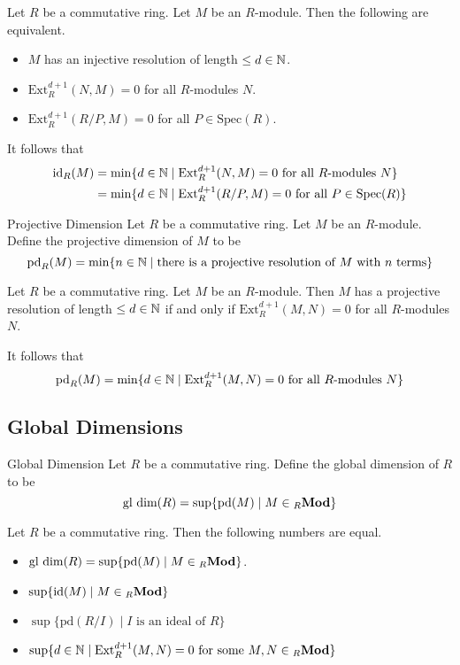 \documentclass[a4paper]{article}
\begin{document}
\begin{prp}{}{} Let $R$ be a commutative ring. Let $M$ be an $R$-module. Then the following are equivalent. 
\begin{itemize}
\item $M$ has an injective resolution of length $\leq d\in\mathbb{N}$. 
\item $\text{Ext}_R^{d+1}(N,M)=0$ for all $R$-modules $N$. 
\item $\text{Ext}_R^{d+1}(R/P,M)=0$ for all $P\in\text{Spec}(R)$. 
\end{itemize}
\end{prp}

It follows that 
\begin{align*}
\text{id}_R(M)&=\min\{d\in\mathbb{N}\;|\;\text{Ext}_R^{d+1}(N,M)=0\text{ for all }R\text{-modules }N\}\\
&=\min\{d\in\mathbb{N}\;|\;\text{Ext}_R^{d+1}(R/P,M)=0\text{ for all }P\in\text{Spec}(R)\}
\end{align*}

\begin{defn}{Projective Dimension}{} Let $R$ be a commutative ring. Let $M$ be an $R$-module. Define the projective dimension of $M$ to be $$\text{pd}_R(M)=\min\{n\in\mathbb{N}\;|\;\text{there is a projective resolution of }M\text{ with }n\text{ terms}\}$$
\end{defn}

\begin{prp}{}{} Let $R$ be a commutative ring. Let $M$ be an $R$-module. Then $M$ has a projective resolution of length $\leq d\in\mathbb{N}$ if and only if $\text{Ext}_R^{d+1}(M,N)=0$ for all $R$-modules $N$. 
\end{prp}

It follows that $$\text{pd}_R(M)=\min\{d\in\mathbb{N}\;|\;\text{Ext}_R^{d+1}(M,N)=0\text{ for all }R\text{-modules }N\}$$

\subsection{Global Dimensions}
\begin{defn}{Global Dimension}{} Let $R$ be a commutative ring. Define the global dimension of $R$ to be $$\text{gl dim}(R)=\sup\{\text{pd}(M)\;|\;M\in{_R\bold{Mod}}\}$$
\end{defn}

\begin{prp}{}{} Let $R$ be a commutative ring. Then the following numbers are equal. 
\begin{itemize}
\item $\text{gl dim}(R)=\sup\{\text{pd}(M)\;|\;M\in{_R\bold{Mod}}\}$. 
\item $\sup\{\text{id}(M)\;|\;M\in{_R\bold{Mod}}\}$
\item $\sup\{\text{pd}(R/I)\;|\;I\text{ is an ideal of }R\}$
\item $\sup\{d\in\mathbb{N}\;|\;\text{Ext}_R^{d+1}(M,N)=0\text{ for some }M,N\in{_R\bold{Mod}}\}$
\end{itemize}
\end{prp}
\end{document}
